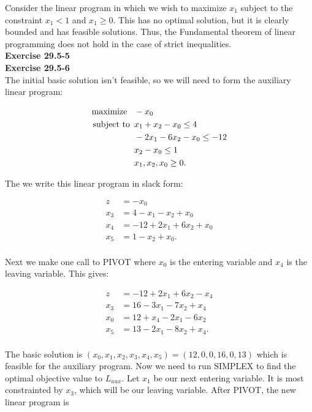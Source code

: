 \documentclass{article}
\begin{document}
Consider the linear program in which we wish to maximize $x_1$ subject to the constraint $x_1 < 1$ and $x_1 \geq 0$.  This has no optimal solution, but it is clearly bounded and has feasible solutions. Thus, the Fundamental theorem of linear programming does not hold in the case of strict inequalities. \\

\noindent\textbf{Exercise 29.5-5}\\

\noindent\textbf{Exercise 29.5-6}\\

The initial basic solution isn't feasible, so we will need to form the auxiliary linear program:

\begin{align*}
\mbox{maximize \,\,\,} & -x_0\\
\mbox{subject to \,} &x_1 + x_2 - x_0 \leq 4 \\
& -2x_1 - 6x_2 - x_0 \leq -12\\
& x_2 - x_0 \leq 1 \\
& x_1,x_2,x_0 \geq 0.
\end{align*}

The we write this linear program in slack form:

\begin{align*}
z &= -x_0\\
x_3 &= 4 - x_1 - x_2 + x_0  \\
x_4 &= -12 + 2x_1 + 6x_2 + x_0 \\
x_5 &= 1 - x_2 + x_0. \\
\end{align*}

Next we make one call to PIVOT where $x_0$ is the entering variable and $x_4$ is the leaving variable. This gives:

\begin{align*}
z &= -12 + 2x_1 + 6x_2 - x_4\\
x_3 &= 16 - 3x_1 - 7x_2 + x_4  \\
x_0 &= 12 + x_4 - 2x_1 - 6x_2 \\
x_5 &= 13 - 2x_1 - 8x_2 + x_4. \\
\end{align*}

The basic solution is $(x_0,x_1,x_2,x_3,x_4,x_5) = (12, 0,0,16,0,13)$ which is feasible for the auxiliary program.  Now we need to run SIMPLEX to find the optimal objective value to $L_{aux}$.  Let $x_1$ be our next entering variable.  It is most constrainted by $x_3$, which will be our leaving variable.  After PIVOT, the new linear program is
\end{document}
